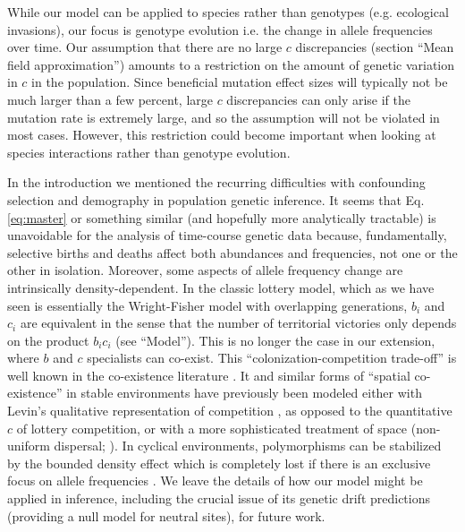 \documentclass[11pt]{article}
\begin{document}
While our model can be applied to species rather than genotypes (e.g. ecological invasions), our focus is genotype evolution i.e. the change in allele frequencies over time. Our assumption that there are no large $c$ discrepancies (section ``Mean field approximation'') amounts to a restriction on the amount of genetic variation in $c$ in the population. Since beneficial mutation effect sizes will typically not be much larger than a few percent, large $c$ discrepancies can only arise if the mutation rate is extremely large, and so the assumption will not be violated in most cases. However, this restriction could become important when looking at species interactions rather than genotype evolution.

In the introduction we mentioned the recurring difficulties with confounding selection and demography in population genetic inference. It seems that Eq. \eqref{eq:master} or something similar (and hopefully more analytically tractable) is unavoidable for the analysis of time-course genetic data because, fundamentally, selective births and deaths affect both abundances and frequencies, not one or the other in isolation. Moreover, some aspects of allele frequency change are intrinsically density-dependent. In the classic lottery model, which as we have seen is essentially the Wright-Fisher model with overlapping generations, $b_i$ and $c_i$ are  equivalent in the sense that the number of territorial victories only depends on the product $b_i c_i$ (see ``Model''). This is no longer the case in our extension, where $b$ and $c$ specialists can co-exist. This ``colonization-competition trade-off'' is well known in the co-existence literature \citep{tilman_94}. It and similar forms of ``spatial co-existence'' in stable environments have previously been modeled either with Levin's  qualitative representation of competition \citep{levins_71,tilman_94}, as opposed to the quantitative $c$ of lottery competition, or with a more sophisticated treatment of space (non-uniform dispersal; \citealt{shmida_84,bolker_99}). In cyclical environments, polymorphisms can be stabilized by the bounded density effect which is  completely lost if there is an exclusive focus on allele frequencies \citep{yi_2013}. We leave the details of how our model might be applied in inference, including the crucial issue of its genetic drift predictions (providing a null model for neutral sites), for future work. 

\end{document}
